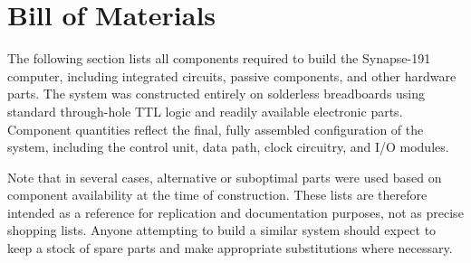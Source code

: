 \section{Bill of Materials} \label{sec:bom}
The following section lists all components required to build the Synapse-191 computer, including
integrated circuits, passive components, and other hardware parts.  
The system was constructed entirely on solderless breadboards using standard through-hole
TTL logic and readily available electronic parts.  
Component quantities reflect the final, fully assembled configuration of the system,
including the control unit, data path, clock circuitry, and I/O modules.

Note that in several cases, alternative or suboptimal parts were used based on component
availability at the time of construction.  
These lists are therefore intended as a reference for replication and documentation purposes,
not as precise shopping lists.  
Anyone attempting to build a similar system should expect to keep a stock of spare parts and
make appropriate substitutions where necessary.

